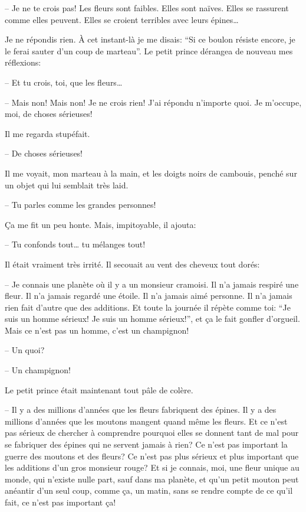 \begin{Parallel}[p]{}{}
{-- Je ne te crois pas! Les fleurs sont faibles. Elles
sont naïves. Elles se rassurent comme elles peuvent.
Elles se croient terribles avec leurs épines\ldots{}

Je ne répondis rien. À cet instant-là je me disais: ``Si ce boulon résiste encore, je le ferai sauter d'un
coup de marteau''. Le petit prince dérangea de nouveau mes réflexions:

-- Et tu crois, toi, que les fleurs\ldots{}

-- Mais non! Mais non! Je ne crois rien! J'ai
répondu n'importe quoi. Je m'occupe, moi, de
choses sérieuses!

Il me regarda stupéfait.

-- De choses sérieuses!

Il me voyait, mon marteau à la main, et les doigts
noirs de cambouis, penché sur un objet qui lui semblait très laid.

-- Tu parles comme les grandes personnes!

Ça me fit un peu honte. Mais, impitoyable, il ajouta:

-- Tu confonds tout\ldots{} tu mélanges tout!

Il était vraiment très irrité. Il secouait au vent des
cheveux tout dorés:

-- Je connais une planète où il y a un monsieur cramoisi. Il n'a jamais respiré une fleur. Il n'a jamais
regardé une étoile. Il n'a jamais aimé personne. Il
n'a jamais rien fait d'autre que des additions. Et
toute la journée il répète comme toi: ``Je suis un
homme sérieux! Je suis un homme sérieux!'', et ça
le fait gonfler d'orgueil. Mais ce n'est pas un
homme, c'est un champignon!

-- Un quoi?

-- Un champignon!

Le petit prince était maintenant tout pâle de colère.

-- Il y a des millions d'années que les fleurs fabriquent des
épines. Il y a des millions d'années que les moutons mangent
quand même les fleurs. Et ce n'est pas sérieux de chercher à
comprendre pourquoi elles se
donnent tant de mal pour se
fabriquer des épines qui ne servent jamais à rien? Ce n'est pas
important la guerre des moutons et des fleurs? Ce n'est pas
plus sérieux et plus important que les additions d'un gros
monsieur rouge? Et si je connais, moi, une fleur unique
au monde, qui n'existe nulle part, sauf dans ma planète,
et qu'un petit mouton peut anéantir d'un seul coup, comme ça, un matin, sans
se rendre compte de ce qu'il fait, ce n'est pas important ça!

}
\end{Parallel}
